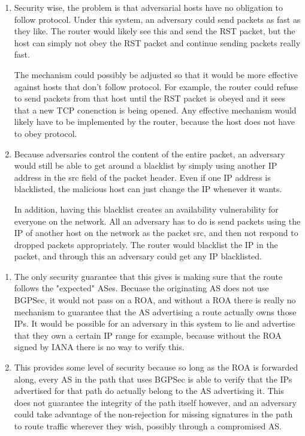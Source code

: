 \documentclass{jhwhw}
\begin{document}
\begin{enumerate}
\item Security wise, the problem is that adversarial hosts have no obligation to follow protocol. Under this system, an adversary could send packets as fast as they like. The router would likely see this and send the RST packet, but the host can simply not obey the RST packet and continue sending packets really fast. 

The mechanism could possibly be adjusted so that it would be more effective against hosts that don't follow protocol. For example, the router could refuse to send packets from that host until the RST packet is obeyed and it sees that a new TCP conenction is being opened. Any effective mechanism would likely have to be implemented by the router, because the host does not have to obey protocol.
\item Because adversaries control the content of the entire packet, an adversary would still be able to get around a blacklist by simply using another IP address in the src field of the packet header. Even if one IP address is blacklisted, the malicious host can just change the IP whenever it wants.

In addition, having this blacklist creates an availability vulnerability for everyone on the network. All an adversary has to do is send packets using the IP of another host on the network as the packet src, and then not respond to dropped packets appropriately. The router would blacklist the IP in the packet, and through this an adversary could get any IP blacklisted.
\end{enumerate}

\begin{enumerate}
\item The only security guarantee that this gives is making sure that the route follows the "expected" ASes. Becuase the originating AS does not use BGPSec, it would not pass on a ROA, and without a ROA there is really no mechanism to guarantee that the AS advertising a route actually owns those IPs. It would be possible for an adversary in this system to lie and advertise that they own a certain IP range for example, because without the ROA signed by IANA there is no way to verify this.
\item This provides some level of security because so long as the ROA is forwarded along, every AS in the path that uses BGPSec is able to verify that the IPs advertised for that path do actually belong to the AS advertising it. This does not guarantee the integrity of the path itself however, and an adversary could take advantage of the non-rejection for missing signatures in the path to route traffic wherever they wish, possibly through a compromised AS.
\end{enumerate}
\end{document}
